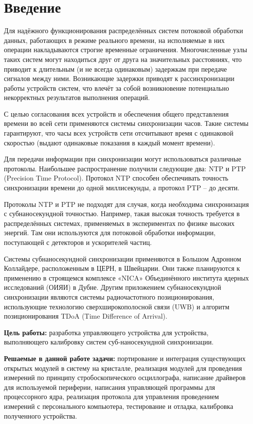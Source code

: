 \chapter*{Введение} %

Для надёжного функционирования распределённых систем потоковой обработки данных, работающих в
режиме реального времени, на исполняемые в них операции накладываются строгие временные ограничения.
Многочисленные узлы таких систем могут находиться друг от друга на значительных расстояниях, 
что приводит к длительным (и не всегда одинаковым) задержкам при передаче сигналов между ними.
Возникающие задержки приводят к рассинхронизации работы устройств систем, что влечёт за собой 
возникновение потенциально некорректных результатов выполнения операций. 

С целью согласования всех устройств и обеспечения общего представления времени во всей сети применяются 
системы синхронизации часов. Такие системы гарантируют, что часы всех устройств сети отсчитывают время с 
одинаковой скоростью (выдают одинаковые показания в каждый момент времени).

Для передачи информации при синхронизации могут использоваться различные протоколы.
Наибольшее распространение получили следующие два: NTP и PTP (Precision Time Protocol).
Протокол NTP способен обеспечивать точность синхронизации времени до одной миллисекунды, а протокол PTP – до десяти. 

Протоколы NTP и PTP не подходят для случая, когда необходима синхронизация с субнаносекундной точностью. Например, 
такая высокая точность требуется в распределённых системах, применяемых в экспериментах по физике высоких энергий.
Там они используются для потоковой обработки информации, поступающей с детекторов и ускорителей частиц. 

Системы субнаносекундной синхронизации применяются в Большом Адронном Коллайдере, расположенным в ЦЕРН, в Швейцарии. Они также
планируются к применению в строящемся комплексе «NICA» Объединённого института ядерных исследований (ОИЯИ) в Дубне. 
Другим приложением субнаносекундной синхронизации являются системы радиочастотного позиционирования,
использующие технологию сверхширокополосной связи (UWB) и алгоритм позиционирования TDoA (Time Difference of Arrival).

\textbf{Цель работы:} разработка управляющего устройства для устройства, выполняющего калибровку систем суб-наносекундной синхронизации.

\textbf{Решаемые в данной работе задачи:} портирование и интеграция существующих открытых модулей в систему на кристалле, 
реализация модулей для проведения измерений по принципу стробоскопического осциллографа, написание драйверов для используемой периферии,
написания управляющей программы для процессорного ядра, реализация протокола для управления проведением измерений с персонального компьютера, 
тестирование и отладка, калибровка полученного устройства.
